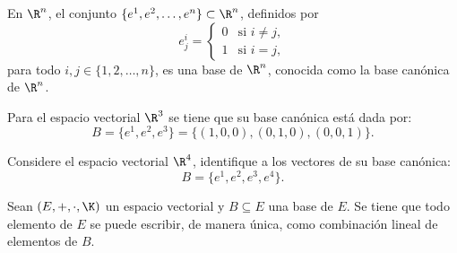 \documentclass[compacto,10pt]{pubciencias-notas}
\begin{document}
\begin{teo}
    En $\R^n$, el conjunto $\{e^1,e^2,\ldots,e^n\}\subset\R^n$, definidos por 
    \[
        e^i_j=
        \begin{cases}
            0& \text{si }i\neq j,\\
            1& \text{si }i= j,
        \end{cases}
    \]
    para todo $i,j\in\{1,2,\ldots,n\}$, es una base de $\R^n$, conocida como la base canónica de $\R^{n}$.
\end{teo}

\begin{ejem}\hspace{0pt}
Para el espacio vectorial $\R^{3}$ se tiene que su base canónica está dada por:
\[
    B = \{e^{1}, e^{2}, e^{3}\} = \{(1, 0, 0), (0, 1, 0), (0, 0, 1)\}.
\]
\end{ejem}

\begin{ejer}\hspace{0pt}
Considere el espacio vectorial $\R^{4}$, identifique a los vectores de su  base canónica:
\[
    B = \{e^{1}, e^{2}, e^{3}, e^4\}.
\]
\end{ejer}




\begin{teo}
    Sean $(E,+,\cdot,\K)$ un espacio vectorial y $B\subseteq E$ una base de $E$. Se tiene que todo elemento de $E$ se puede escribir, de manera única, como combinación lineal de elementos de $B$.
\end{teo}
\end{document}
